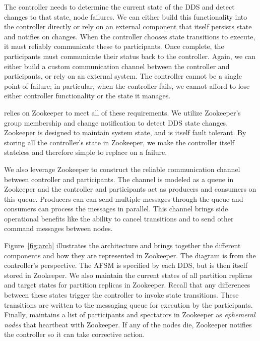 The controller needs to determine the current state of the DDS and detect
changes to that state, \eg node failures.  We can either build this
functionality into the controller directly or rely on an external component that
itself persists state and notifies on changes. 
When the controller chooses state transitions to execute, it must reliably
communicate these to participants.  Once complete, the participants must
communicate their status back to the controller.  Again, we can either build a
custom communication channel between the controller and participants, or rely on an
external system. 
The controller cannot be a single point of failure; in particular, when the
controller fails, we cannot afford to lose either controller functionality or
the state it manages.

\helix relies on Zookeeper to meet all of these requirements.  We utilize
Zookeeper's group membership and change notification to detect DDS state
changes.  Zookeeper is
designed to maintain system state, and is itself fault tolerant.  By storing
all the controller's state in Zookeeper, we make the controller itself stateless
and therefore simple to replace on a failure.  
 
We also leverage Zookeeper to construct the reliable communication channel
between controller and participants.  
The channel is modeled as a queue in Zookeeper and the controller and
participants act as producers and consumers on this queue. Producers can
can send multiple messages through the queue and consumers can process the messages in parallel. 
This channel brings side
operational benefits like the ability to cancel transitions and to send other command messages between nodes.

Figure~\ref{fig:arch} illustrates the \helix architecture and brings together
the different components and how they are represented in Zookeeper.  
The diagram is from the controller's perspective.  The AFSM is specified by each
DDS, but is then itself stored in Zookeeper.  We also maintain the current
states of all partition replicas and target states for partition replicas in
Zookeeper.  Recall that any differences between these states trigger the
controller to invoke state transitions.  These transitions are written to
the messaging queue for execution by the participants.  Finally, \helix
maintains a list of participants and spectators in 
Zookeeper as \emph{ephemeral nodes} that heartbeat with Zookeeper.  If any of
the nodes die, Zookeeper notifies the controller so it can take corrective
action.

